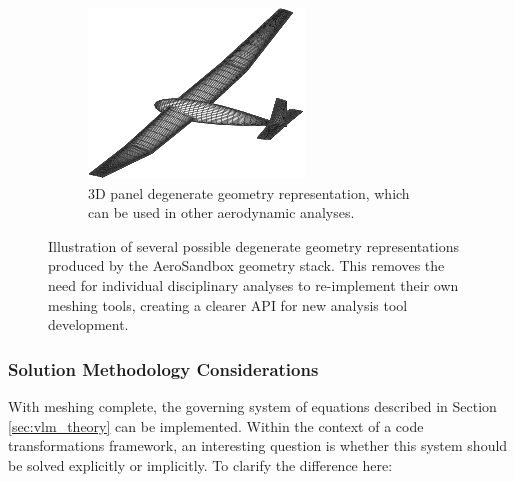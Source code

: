 \begin{figure}[H]
\begin{subfigure}{0.32\textwidth}
        \label{fig:geometry_mean_camber}
    \end{subfigure}
    \begin{subfigure}{0.32\textwidth}
        \includegraphics[width=\textwidth]{../figures/geometry_panel-crop.pdf}
        \caption{3D panel degenerate geometry representation, which can be used in other aerodynamic analyses.}
        \label{fig:geometry_panel}
    \end{subfigure}
    \caption{Illustration of several possible degenerate geometry representations produced by the AeroSandbox geometry stack. This removes the need for individual disciplinary analyses to re-implement their own meshing tools, creating a clearer API for new analysis tool development.}
    \label{fig:degen_geometry}
\end{figure}

\subsubsection{Solution Methodology Considerations}

With meshing complete, the governing system of equations described in Section \ref{sec:vlm_theory} can be implemented. Within the context of a code transformations framework, an interesting question is whether this system should be solved explicitly or implicitly. To clarify the difference here:

